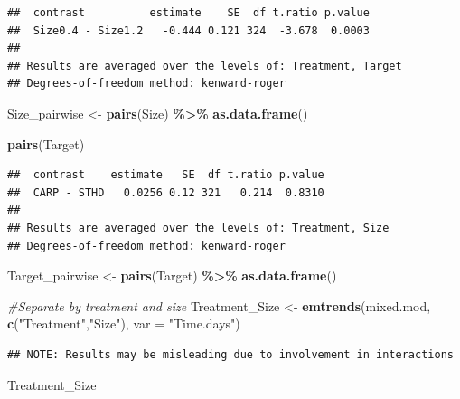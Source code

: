 \documentclass[
]{article}
\newenvironment{Shaded}{\begin{snugshade}}{\end{snugshade}}
\newcommand{\AttributeTok}[1]{\textcolor[rgb]{0.13,0.29,0.53}{#1}}
\newcommand{\CommentTok}[1]{\textcolor[rgb]{0.56,0.35,0.01}{\textit{#1}}}
\newcommand{\FunctionTok}[1]{\textcolor[rgb]{0.13,0.29,0.53}{\textbf{#1}}}
\newcommand{\NormalTok}[1]{#1}
\newcommand{\OtherTok}[1]{\textcolor[rgb]{0.56,0.35,0.01}{#1}}
\newcommand{\SpecialCharTok}[1]{\textcolor[rgb]{0.81,0.36,0.00}{\textbf{#1}}}
\newcommand{\StringTok}[1]{\textcolor[rgb]{0.31,0.60,0.02}{#1}}
\begin{document}
\begin{verbatim}
##  contrast          estimate    SE  df t.ratio p.value
##  Size0.4 - Size1.2   -0.444 0.121 324  -3.678  0.0003
## 
## Results are averaged over the levels of: Treatment, Target 
## Degrees-of-freedom method: kenward-roger
\end{verbatim}

\begin{Shaded}
\begin{Highlighting}[]
\NormalTok{Size\_pairwise }\OtherTok{\textless{}{-}} \FunctionTok{pairs}\NormalTok{(Size) }\SpecialCharTok{\%\textgreater{}\%} \FunctionTok{as.data.frame}\NormalTok{()}

\FunctionTok{pairs}\NormalTok{(Target)}
\end{Highlighting}
\end{Shaded}

\begin{verbatim}
##  contrast    estimate   SE  df t.ratio p.value
##  CARP - STHD   0.0256 0.12 321   0.214  0.8310
## 
## Results are averaged over the levels of: Treatment, Size 
## Degrees-of-freedom method: kenward-roger
\end{verbatim}

\begin{Shaded}
\begin{Highlighting}[]
\NormalTok{Target\_pairwise }\OtherTok{\textless{}{-}} \FunctionTok{pairs}\NormalTok{(Target) }\SpecialCharTok{\%\textgreater{}\%} \FunctionTok{as.data.frame}\NormalTok{()}



\CommentTok{\#Separate by treatment and size}
\NormalTok{Treatment\_Size }\OtherTok{\textless{}{-}} \FunctionTok{emtrends}\NormalTok{(mixed.mod, }\FunctionTok{c}\NormalTok{(}\StringTok{"Treatment"}\NormalTok{,}\StringTok{"Size"}\NormalTok{), }\AttributeTok{var =} \StringTok{"Time.days"}\NormalTok{)}
\end{Highlighting}
\end{Shaded}

\begin{verbatim}
## NOTE: Results may be misleading due to involvement in interactions
\end{verbatim}

\begin{Shaded}
\begin{Highlighting}[]
\NormalTok{Treatment\_Size}
\end{Highlighting}
\end{Shaded}
\end{document}
